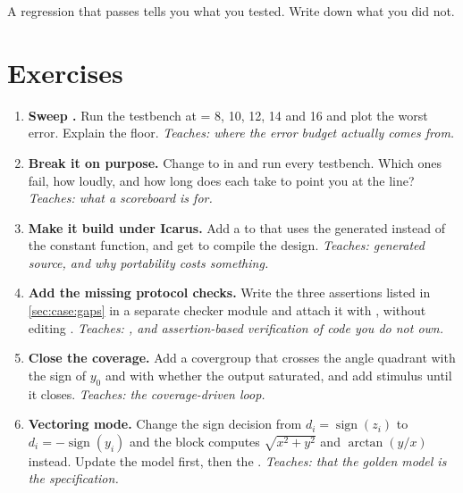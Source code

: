 \begin{ruleofthumb}
A regression that passes tells you what you tested. Write down what you did
not.
\end{ruleofthumb}

\section{Exercises}
\label{sec:case:exercises}

\begin{enumerate}
  \item \textbf{Sweep .} Run the testbench at  = 8, 10,
        12, 14 and 16 and plot the worst error. Explain the floor.
        \emph{Teaches: where the error budget actually comes from.}

  \item \textbf{Break it on purpose.} Change \code{>>>} to \code{>>} in
         and run every testbench. Which ones fail, how
        loudly, and how long does each take to point you at the line?
        \emph{Teaches: what a scoreboard is for.}

  \item \textbf{Make it build under Icarus.} Add a  to
         that uses the generated
         instead of the constant function, and
        get  to compile the design.
        \emph{Teaches: generated source, and why portability costs something.}

  \item \textbf{Add the missing protocol checks.} Write the three assertions
        listed in \cref{sec:case:gaps} in a separate checker module and attach
        it with , without editing .
        \emph{Teaches: , and assertion-based verification of code
        you do not own.}

  \item \textbf{Close the coverage.} Add a covergroup that crosses the angle
        quadrant with the sign of $y_0$ and with whether the output
        saturated, and add stimulus until it closes.
        \emph{Teaches: the coverage-driven loop.}

  \item \textbf{Vectoring mode.} Change the sign decision from
        $d_i = \operatorname{sign}(z_i)$ to
        $d_i = -\operatorname{sign}(y_i)$ and the block computes
        $\sqrt{x^2+y^2}$ and $\arctan(y/x)$ instead. Update the model first,
        then the \RTL{}.
        \emph{Teaches: that the golden model is the specification.}


\end{enumerate}
